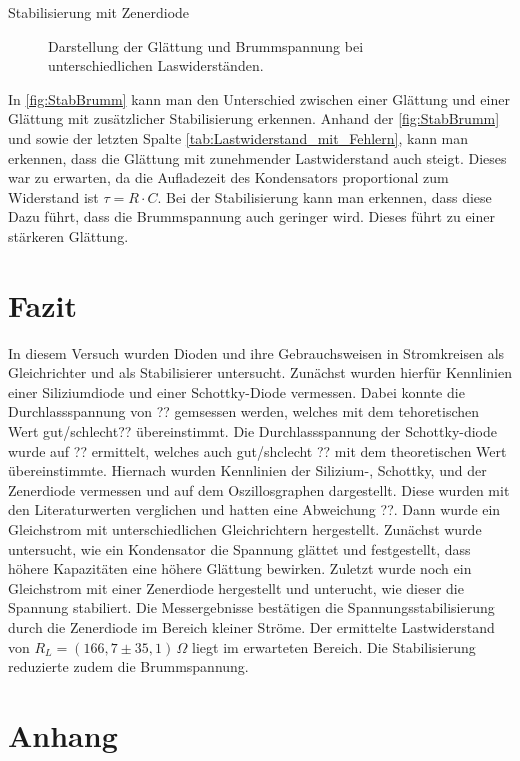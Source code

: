 \documentclass{article}
\theoremstyle{definition}
\begin{document}
\begin{aufgabe}{Stabilisierung mit Zenerdiode}
\begin{figure}[h!]
    \caption{Darstellung der Glättung und Brummspannung bei unterschiedlichen Laswiderständen.}
    \label{fig:StabBrumm}
\end{figure}

In \autoref{fig:StabBrumm} kann man den Unterschied zwischen einer Glättung und einer Glättung mit zusätzlicher Stabilisierung erkennen. Anhand der \autoref{fig:StabBrumm} und sowie der letzten Spalte \autoref{tab:Lastwiderstand_mit_Fehlern}, kann man erkennen, dass die Glättung mit zunehmender Lastwiderstand auch steigt. Dieses war zu erwarten, da die Aufladezeit des Kondensators proportional zum Widerstand ist $\tau = R \cdot C$. Bei der Stabilisierung kann man erkennen, dass diese Dazu führt, dass die Brummspannung auch geringer wird. Dieses führt zu einer stärkeren Glättung.

\end{aufgabe}




\section{Fazit}
In diesem Versuch wurden Dioden und ihre Gebrauchsweisen in Stromkreisen als Gleichrichter und als Stabilisierer untersucht. 
Zunächst wurden hierfür Kennlinien einer Siliziumdiode und einer Schottky-Diode vermessen. Dabei konnte die Durchlassspannung von ?? gemsessen werden, 
welches mit dem tehoretischen Wert gut/schlecht?? übereinstimmt. Die Durchlassspannung der Schottky-diode wurde auf ?? ermittelt, welches auch gut/shclecht ?? mit dem theoretischen Wert übereinstimmte. 
Hiernach wurden Kennlinien der Silizium-, Schottky, und der Zenerdiode vermessen und auf dem Oszillosgraphen dargestellt. Diese wurden mit den Literaturwerten verglichen und hatten eine Abweichung ??. 
Dann wurde ein Gleichstrom mit unterschiedlichen Gleichrichtern hergestellt. Zunächst wurde untersucht, wie ein Kondensator die Spannung glättet und festgestellt, dass höhere Kapazitäten eine höhere Glättung bewirken. 
Zuletzt wurde noch ein Gleichstrom mit einer Zenerdiode hergestellt und unterucht, wie dieser die Spannung stabiliert. 
Die Messergebnisse bestätigen die Spannungsstabilisierung durch die Zenerdiode im Bereich kleiner Ströme. 
Der ermittelte Lastwiderstand von \( R_L = (166{,}7 \pm 35{,}1)\,\Omega \) liegt im erwarteten Bereich. 
Die Stabilisierung reduzierte zudem die Brummspannung.

\newpage
\section{Anhang}
\end{document}
